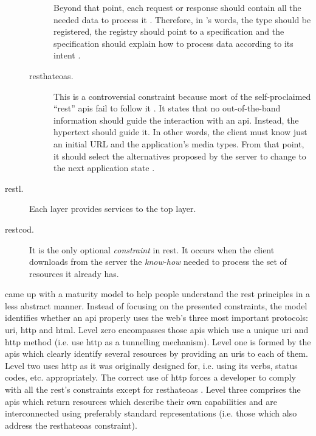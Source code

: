 \begin{description}
\begin{description}
	                        Beyond that point, each request or response should contain all the needed data to process it \citep{wahbe_self-descriptive_2010}.
	                        Therefore, in \citeauthor{fielding_seeking_2006}'s words,
	                        the type should be registered,
	                        the registry should point to a specification and 
	                        the specification should explain how to process data according to its intent \citep{fielding_seeking_2006}. %
	\item[\acf{resthateoas}.] This is a controversial constraint because most of the self-proclaimed ``\ac{rest}'' \acp{api} fail to follow it \citep{moore_hypermedia_2010,house_how_2012}.
	                           It states that no out-of-the-band information should guide the interaction with an \ac{api}.
	                           Instead, the hypertext should guide it.
	                           In other words, the client must know just an initial URL and the application's media types.
	                           From that point, it should select the alternatives proposed by the server to change to the next application state \citep{fielding_rest_2008}.
    \end{description}
 \item[\acf{restl}.] Each layer provides services to the top layer. %
 \item[\acf{restcod}.] It is the only optional \emph{constraint} in \ac{rest}.
		       It occurs when the client downloads from the server the \emph{know-how} needed to process the set of resources it already has.
\end{description}



\citet{richardson_introducing_2008} came up with a maturity model to help people understand the \ac{rest} principles in a less abstract manner.
Instead of focusing on the presented constraints, the model identifies whether an \ac{api} properly uses the web's three most important protocols: \ac{uri}, \ac{http} and \ac{html}.
Level zero encompasses those \acp{api} which use a unique \ac{uri} and \ac{http} method (i.e. use \ac{http} as a tunnelling mechanism).
Level one is formed by the \acp{api} which clearly identify several resources by providing an \acp{uri} to each of them.
Level two uses \ac{http} as it was originally designed for, i.e. using its verbs, status codes, etc. appropriately. 
The correct use of \ac{http} forces a developer to comply with all the \ac{rest}'s constraints except for \ac{resthateoas} \citep{moore_hypermedia_2010}.
Level three comprises the \acp{api} which return resources which describe their own capabilities and are interconnected using preferably standard representations (i.e. those which also address the \acf{resthateoas} constraint).



